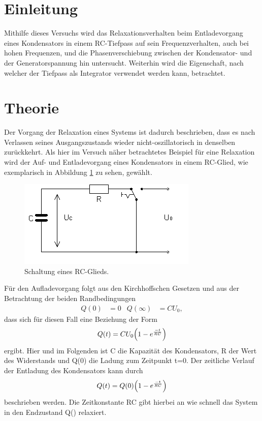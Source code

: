 \section{Einleitung}
\label{sec:Einleitung}
Mithilfe dieses Versuchs wird das Relaxationsverhalten beim Entladevorgang
eines Kondensators in einem RC-Tiefpass auf sein Frequenzverhalten, auch bei
hohen Frequenzen, und die Phasenverschiebung zwischen der Kondensator- und der
Generatorspannung hin untersucht. Weiterhin wird die Eigenschaft, nach welcher
der Tiefpass als Integrator verwendet werden kann, betrachtet.
\section{Theorie}
\label{sec:Theorie}
Der Vorgang der Relaxation eines Systems ist dadurch beschrieben, dass es nach Verlassen seines
Ausgangszustands wieder nicht-oszillatorisch in denselben zurückkehrt.\newline
Als hier im Versuch näher betrachtetes Beispiel für eine Relaxation wird der Auf- und Entladevorgang eines Kondensators in einem
RC-Glied, wie exemplarisch in Abbildung \ref{fig:bild1} zu sehen, gewählt.
\begin{figure}[H]
  \centering
  \includegraphics[scale=1.0]{bilder/bild11.png}
  \caption{Schaltung eines RC-Glieds.}
  \label{fig:bild1}
\end{figure}
Für den Aufladevorgang folgt aus den Kirchhoffschen Gesetzen und aus der Betrachtung der beiden Randbedingungen
\begin{align}
Q(0)&=0 & Q(\infty)&=CU_0,
\label{eq:RB}
\end{align}
dass sich für diesen Fall eine Beziehung der Form
\begin{equation}
Q(t)=CU_0 \Bigl(1-e^{\frac{-t}{RC}}\Bigr)
\label{fig:aufladen}
\end{equation}
ergibt.\newline
Hier und im Folgenden ist C die Kapazität des Kondensators, R der Wert des Widerstands und Q(0) die Ladung zum Zeitpunkt t=0.\newline
Der zeitliche Verlauf der Entladung des Kondensators kann durch
\begin{equation}
Q(t)=Q(0) \Bigl(1-e^{\frac{-t}{RC}}\Bigr)
\label{eq:entladen}
\end{equation}
beschrieben werden.\newline
Die Zeitkonstante RC gibt hierbei an wie schnell das System in den Endzustand Q(\infty) relaxiert.\newline

